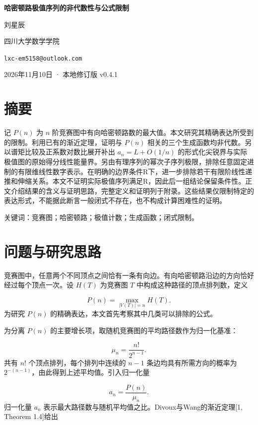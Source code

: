 \documentclass[UTF8,11pt,fontset=fandol]{ctexart}
\begin{document}
\begin{center}
{\LARGE\bfseries 哈密顿路极值序列的非代数性与公式限制\par}
\vspace{1.2em}
{\large 刘星辰\par}
\vspace{0.5em}
{\normalsize 四川大学数学学院\par}
{\normalsize \texttt{lxc-em5158@outlook.com}\par}
\vspace{0.5em}
{\small 2026年11月10日 · 本地修订版 v0.4.1\par}
\end{center}
\vspace{1em}

\section*{摘要}
记 $P(n)$ 为 $n$ 阶竞赛图中有向哈密顿路数的最大值。本文研究其精确表达所受到的限制。利用已有的渐近定理，证明与 $P(n)$ 相关的三个生成函数均非代数。另以谱矩比较及正系数对数比展开补出 $a_n=L+O(1/n)$ 的形式化尖锐界与实际极值图的原始得分线性能量界。另由有理序列的幂次子序列极限，排除任意固定进制的有限维线性数字表示。在明确的边界条件R下，进一步排除若干有限阶线性递推和伸缩关系。本文不证明实际极值序列满足R，因此后一组结论保留条件性。正文介绍结果的含义与证明思路，完整定义和证明列于附录。这些结果仅限制特定的表达形式，不能据此断言一般闭式不存在，也不构成计算困难性的证明。

关键词：竞赛图；哈密顿路；极值计数；生成函数；闭式限制。



\section{问题与研究思路}
竞赛图中，任意两个不同顶点之间恰有一条有向边。有向哈密顿路沿边的方向恰好经过每个顶点一次。设 $H(T)$ 为竞赛图 $T$ 中构成这种路径的顶点排列数，定义

\[
P(n)=\max_{|V(T)|=n}H(T).
\]
为研究 $P(n)$ 的精确表达，本文首先考察其中几类可以排除的公式。

为分离 $P(n)$ 的主要增长项，取随机竞赛图的平均路径数作为归一化基准：

\[
\mu_n=\frac{n!}{2^{n-1}}.
\]
共有 $n!$ 个顶点排列，每个排列中连续的 $n-1$ 条边均具有所需方向的概率为 $2^{-(n-1)}$，由此得到上述平均值。引入归一化量

\[
a_n=\frac{P(n)}{\mu_n}.
\]
归一化量 $a_n$ 表示最大路径数与随机平均值之比。Divoux与Wang的渐近定理[1, Theorem 1.4]给出
\end{document}
